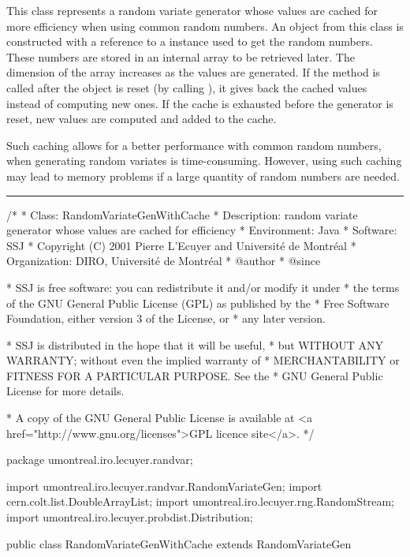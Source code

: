
This class represents a random variate generator whose values
are cached for more efficiency when using
common random numbers.  An object
from this class is constructed with a reference to a
 instance used to
get the random numbers.  These numbers
are stored in an internal array to be retrieved later.
The dimension of the array increases as the values
are generated.
If the  method is called after
the object is reset (by calling 
), it gives back the cached
values instead of computing new ones.
If the cache is exhausted before the generator is reset,
new values are computed and added to the cache.

Such caching allows for a better performance with
common random numbers, when
generating random variates is time-consuming.
However, using such caching may lead to memory problems if
a large quantity of random numbers are needed.

\bigskip\hrule

\begin{code}
\begin{hide}
/*
 * Class:        RandomVariateGenWithCache
 * Description:  random variate generator whose values are cached for efficiency
 * Environment:  Java
 * Software:     SSJ 
 * Copyright (C) 2001  Pierre L'Ecuyer and Université de Montréal
 * Organization: DIRO, Université de Montréal
 * @author       
 * @since

 * SSJ is free software: you can redistribute it and/or modify it under
 * the terms of the GNU General Public License (GPL) as published by the
 * Free Software Foundation, either version 3 of the License, or
 * any later version.

 * SSJ is distributed in the hope that it will be useful,
 * but WITHOUT ANY WARRANTY; without even the implied warranty of
 * MERCHANTABILITY or FITNESS FOR A PARTICULAR PURPOSE.  See the
 * GNU General Public License for more details.

 * A copy of the GNU General Public License is available at
   <a href="http://www.gnu.org/licenses">GPL licence site</a>.
 */
\end{hide}
package umontreal.iro.lecuyer.randvar;\begin{hide}

import umontreal.iro.lecuyer.randvar.RandomVariateGen;
import cern.colt.list.DoubleArrayList;
import umontreal.iro.lecuyer.rng.RandomStream;
import umontreal.iro.lecuyer.probdist.Distribution;
\end{hide}

public class RandomVariateGenWithCache extends RandomVariateGen\begin{hide} {
   private RandomVariateGen rvg;
   private DoubleArrayList values;
   private int index = 0;
   private boolean caching = true;
\end{hide}
\end{code}

